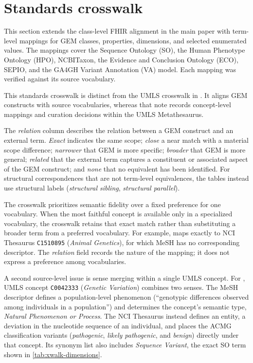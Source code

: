 \section{Standards crosswalk}
\label{sec:supp-crosswalk}

This section extends the class-level FHIR alignment in the main paper with
term-level mappings for GEM classes, properties, dimensions, and selected
enumerated values. The mappings cover the Sequence Ontology (SO), the Human
Phenotype Ontology (HPO), NCBITaxon, the Evidence and Conclusion Ontology
(ECO), SEPIO, and the GA4GH Variant Annotation (VA) model. Each mapping was
verified against its source vocabulary.

This standards crosswalk is distinct from the UMLS crosswalk in
. It aligns GEM constructs with source
vocabularies, whereas that note records concept-level mappings and curation
decisions within the UMLS Metathesaurus.

The \emph{relation} column describes the relation between a GEM construct
and an external term. \emph{Exact} indicates the same scope;
\emph{close} a near match with a material scope difference;
\emph{narrower} that GEM is more specific; \emph{broader} that GEM is more
general; \emph{related} that the external term captures a constituent or
associated aspect of the GEM construct; and \emph{none} that no equivalent
has been identified. For structural correspondences that are not
term-level equivalences, the tables instead use structural labels
(\emph{structural sibling}, \emph{structural parallel}).

The crosswalk prioritizes semantic fidelity over a fixed preference for one
vocabulary. When the most faithful concept is available only in a specialized
vocabulary, the crosswalk retains that exact match rather than substituting a
broader term from a preferred vocabulary. For example,
 maps exactly to NCI Thesaurus
\texttt{C1510895} (\emph{Animal Genetics}), for which MeSH has no
corresponding descriptor. The \emph{relation} field records the nature of
the mapping; it does not express a preference among vocabularies.

A second source-level issue is sense merging within a single UMLS concept.
For , UMLS concept \texttt{C0042333}
(\emph{Genetic Variation}) combines two senses. The MeSH descriptor defines
a population-level phenomenon (``genotypic differences observed among
individuals in a population'') and determines the concept's semantic type,
\emph{Natural Phenomenon or Process}. The NCI Thesaurus instead defines an
entity, a deviation in the nucleotide sequence of an individual, and places
the ACMG classification variants (\emph{pathogenic}, \emph{likely
pathogenic}, and \emph{benign}) directly under that concept. Its synonym
list also includes \emph{Sequence Variant}, the exact SO term shown in
\cref{tab:xwalk-dimensions}.

